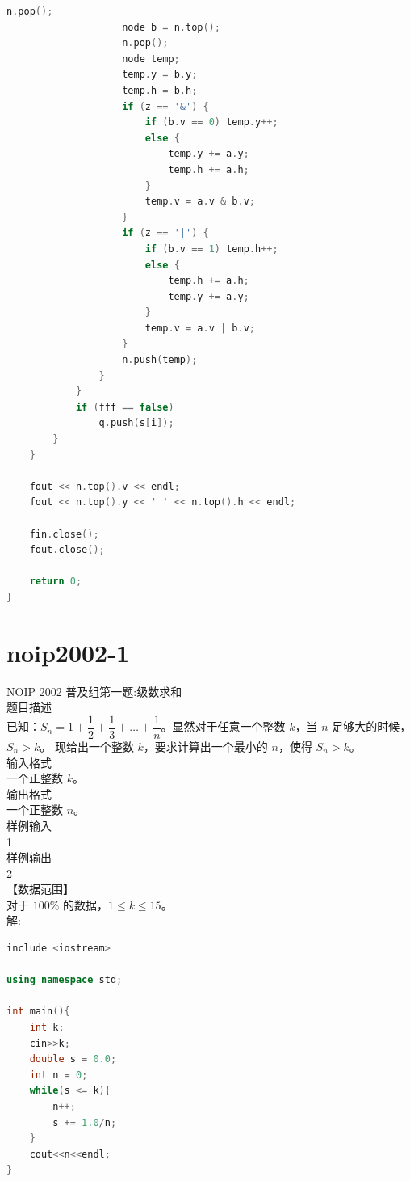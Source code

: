 \documentclass[12pt,twiside,a4paper]{ctexbook}
\numberwithin{chapter}{part}
\begin{document}
\begin{lstlisting}[language=C++]
                    n.pop();
                    node b = n.top();
                    n.pop();
                    node temp;
                    temp.y = b.y;
                    temp.h = b.h;
                    if (z == '&') {
                        if (b.v == 0) temp.y++;
                        else {
                            temp.y += a.y;
                            temp.h += a.h;
                        }
                        temp.v = a.v & b.v;
                    }
                    if (z == '|') {
                        if (b.v == 1) temp.h++;
                        else {
                            temp.h += a.h;
                            temp.y += a.y;
                        }
                        temp.v = a.v | b.v;
                    }
                    n.push(temp);
                }
            }
            if (fff == false)
                q.push(s[i]);
        }
    }
    
    fout << n.top().v << endl;
    fout << n.top().y << ' ' << n.top().h << endl;

    fin.close();
    fout.close();

    return 0;
}
\end{lstlisting}

\section{noip2002-1}
NOIP 2002 普及组第一题:级数求和\\
题目描述\\
已知：$S_n= 1+\dfrac{1}{2}+\dfrac{1}{3}+…+\dfrac{1}{n}$。显然对于任意一个整数 $k$，当 $n$ 足够大的时候，$S_n>k$。
现给出一个整数 $k$，要求计算出一个最小的 $n$，使得 $S_n>k$。\\
输入格式\\
一个正整数 $k$。\\
输出格式\\
一个正整数 $n$。\\
样例输入\\
1\\
样例输出\\
2\\
【数据范围】\\
对于 $100\%$ 的数据，$1\le k \le 15$。\\
解:\\
\begin{lstlisting}[language=c++,breaklines=true]
include <iostream>

using namespace std;

int main(){
	int k;
	cin>>k;
	double s = 0.0;
	int n = 0;
	while(s <= k){
		n++;
		s += 1.0/n;
	}
	cout<<n<<endl;
}
\end{lstlisting}
\end{document}
